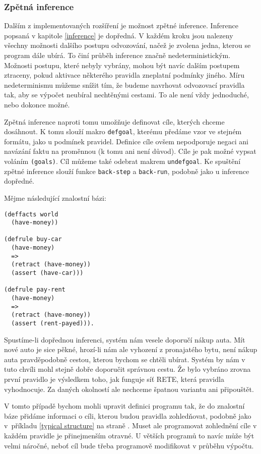 \subsubsection{Zpětná inference}
\label{backward inference}

Dalším z implementovaných rozšíření je možnost zpětné inference. Inference
popsaná v kapitole \ref{inference} je dopředná. V každém kroku jsou nalezeny
všechny možnosti dalšího postupu odvozování, načež je zvolena jedna, kterou se
program dále ubírá. To činí průběh inference značně nedeterministickým. Možnosti
postupu, které nebyly vybrány, mohou být navíc dalším postupem ztraceny, pokud
aktivace některého pravidla zneplatní podmínky jiného.
Míru nedeterminismu můžeme snížit tím, že budeme navrhovat odvozovací pravidla
tak, aby se výpočet neubíral nechtěnými cestami. To ale není vždy jednoduché,
nebo dokonce možné.

Zpětná inference naproti tomu umožňuje definovat cíle, kterých chceme dosáhnout.
K tomu slouží makro \verb|defgoal|, kterému předáme vzor ve stejném formátu,
jako u podmínek pravidel. Definice cíle ovšem nepodporuje negaci ani navázání
faktu na proměnnou (k tomu ani není důvod). Cíle je pak možné vypsat voláním
\verb|(goals)|. Cíl můžeme také odebrat makrem \verb|undefgoal|.
Ke spuštění zpětné inference slouží funkce \verb|back-step| a
\verb|back-run|, podobně jako u inference dopředné.

Mějme následující znalostní bázi:
\begin{verbatim}
(deffacts world
  (have-money))

(defrule buy-car
  (have-money)
  =>
  (retract (have-money))
  (assert (have-car)))

(defrule pay-rent
  (have-money)
  =>
  (retract (have-money))
  (assert (rent-payed))).
\end{verbatim}
Spustíme-li dopřednou inferenci, systém nám vesele doporučí nákup auta.
Mít nové auto je sice pěkné, hrozí-li nám ale vyhození z pronajatého bytu,
není nákup auta pravděpodobně cestou, kterou bychom se chtěli ubírat.
Systém by nám v tuto chvíli mohl stejně dobře doporučit správnou cestu. Že bylo
vybráno zrovna první pravidlo je výsledkem toho, jak funguje síť RETE, která
pravidla vyhodnocuje. Za daných okolností ale nechceme špatnou variantu ani
připouštět.

V tomto případě bychom mohli upravit definici programu tak, že do znalostní báze
přidáme informaci o cíli, kterou budou pravidla zohledňovat, podobně jako
v~příkladu \ref{typical structure} na straně \pageref{typical structure}. Muset
ale programovat zohlednění cíle v každém pravidle je přinejmenším otravné. U
větších programů to navíc může být velmi náročné, neboť cíl bude třeba
programově modifikovat v průběhu výpočtu.

